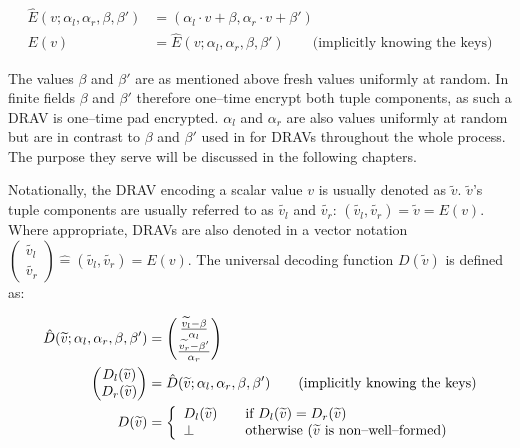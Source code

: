 \begin{align}
  \label{eqn:one-time-pad}
  \hat{E}(v; \alpha_l, \alpha_r, \beta, \beta') &=
  (\alpha_l \cdot v + \beta, \alpha_r \cdot v + \beta')\\
  E(v) &= \hat{E}(v; \alpha_l, \alpha_r, \beta, \beta') \qquad
  \text{(implicitly knowing the keys)}\nonumber
\end{align}

\noindent{}The values $\beta$ and $\beta'$ are as mentioned above fresh values
uniformly at random. In finite fields $\beta$ and $\beta'$ therefore one--time
encrypt both tuple components, as such a DRAV is one--time pad encrypted.
$\alpha_l$ and $\alpha_r$ are also values uniformly at random but are in
contrast to $\beta$ and $\beta'$ used in for DRAVs throughout the whole
process. The purpose they serve will be discussed in the following chapters.

Notationally, the DRAV encoding a scalar value $v$ is usually denoted as
$\widetilde{v}$. $\widetilde{v}$'s tuple components are usually referred to as
$\widetilde{v_l}$ and $\widetilde{v_r}$: $(\widetilde{v_l}, \widetilde{v_r}) =
\widetilde{v} = E(v)$. Where appropriate, DRAVs are also denoted in a vector
notation $\begin{pmatrix}\widetilde{v_l}\\\widetilde{v_r}\end{pmatrix} \hat{=}
(\widetilde{v_l}, \widetilde{v_r}) = E(v)$. The universal decoding function
$D(\widetilde{v})$ is defined as:

\begin{align}
  \hat{D}(\widetilde{v}; \alpha_l, \alpha_r, \beta, \beta') &=
  \begin{pmatrix}
    \frac{\widetilde{v_l} - \beta}{\alpha_l}\\
    \frac{\widetilde{v_r} - \beta'}{\alpha_r}
  \end{pmatrix} \nonumber\\
  \label{eqn:keys-assumed}
\begin{pmatrix}D_l(\widetilde{v})\\D_r(\widetilde{v})\end{pmatrix} &=
  \hat{D}(\widetilde{v}; \alpha_l, \alpha_r, \beta, \beta') \qquad
  \text{(implicitly knowing the keys)}\\
  D(\widetilde{v}) &=
  \left\{
    \begin{array}{l l}
      D_l(\widetilde{v}) & \quad
      \text{if}~D_l(\widetilde{v}) = D_r(\widetilde{v})\\
      \bot & \quad \text{otherwise ($\widetilde{v}$ is non--well--formed)}\\
    \end{array}\right.\nonumber
\end{align}

